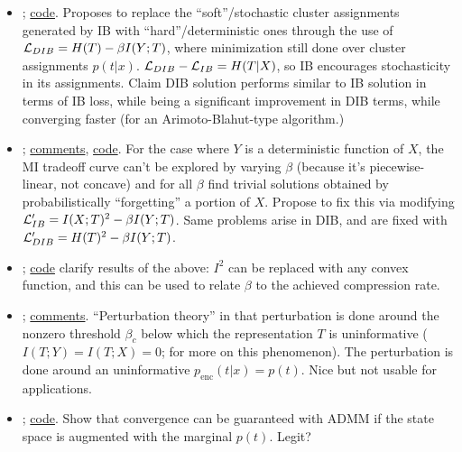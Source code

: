 \documentclass[notitlepage,openany,11pt]{report}
\numberwithin{equation}{section}
\theoremstyle{plain}%
\begin{document}
\begin{itemize}
\item \cite{StrouseSchwab:17}; \href{https://github.com/djstrouse/information-bottleneck}{code}. Proposes to replace the ``soft''/stochastic cluster assignments generated by IB with ``hard''/deterministic ones through the use of $\mathcal{L}_{DIB} = H(T) - \beta I(Y;T)$, where minimization still done over cluster assignments $p(t|x)$. $\mathcal{L}_{DIB} - \mathcal{L}_{IB} = H(T|X)$, so IB encourages stochasticity in its assignments. Claim DIB solution performs similar to IB solution in terms of IB loss, while being a significant improvement in DIB terms, while converging faster (for an Arimoto-Blahut-type algorithm.)

\item \cite{KolchinskyEtAl:18}; \href{https://openreview.net/forum?id=rke4HiAcY7}{comments}, \href{https://github.com/artemyk/ibcurve}{code}. For the case where $Y$ is a deterministic function of $X$, the MI tradeoff curve can't be explored by varying $\beta$ (because it's piecewise-linear, not concave) and for all $\beta$ find trivial solutions obtained by probabilistically ``forgetting'' a portion of $X$. Propose to fix this via modifying $\mathcal{L}'_{IB} = I(X;T)^2 - \beta I(Y;T)$. Same problems arise in DIB, and are fixed with $\mathcal{L}'_{DIB} = H(T)^2 - \beta I(Y;T)$.

\item \cite{RodriguezGalvezEtAl:20}; \href{https://github.com/burklight/convex-IB-Lagrangian-PyTorch}{code} clarify results of the above: $I^{2}$ can be replaced with any convex function, and this can be used to relate $\beta$ to the achieved compression rate.

\item \cite{NgampruetikornSchwab:21}; \href{https://openreview.net/forum?id=A2HvBPoSBMs}{comments}. ``Perturbation theory'' in that perturbation is done around the nonzero threshold $\beta_{c}$ below which the representation $T$ is uninformative ($I(T;Y) = I(T;X) =0$; \cite{WuEtAl:19} for more on this phenomenon). The perturbation is done around an uninformative $p_{\text{enc}}(t|x) = p(t)$. Nice but not usable for applications.

\item \cite{HuangGamal:21}; \href{https://github.com/hui811116/ib-admm}{code}. Show that convergence can be guaranteed with ADMM if the state space is augmented with the marginal $p(t)$. Legit?
\end{itemize}
\end{document}
